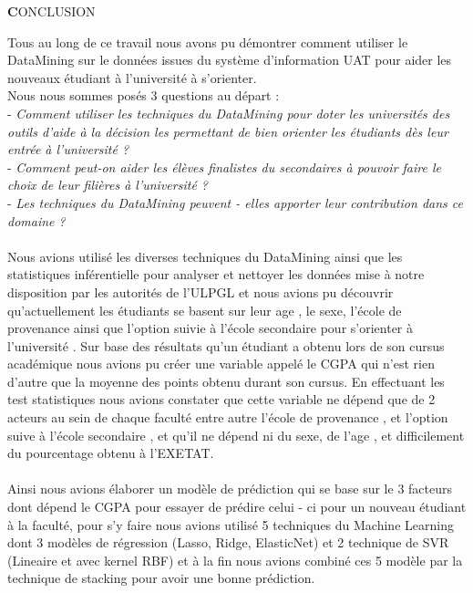 \begin{center}
	 {\LARGE  \textbf CONCLUSION}	
	\end{center}
Tous au long de ce travail nous avons pu démontrer comment utiliser le DataMining sur le données issues du système d'information \ac{UAT} pour aider les nouveaux étudiant à l'université à s'orienter.\\
Nous nous sommes posés 3 questions au départ : \\
- \emph{Comment utiliser les techniques  du DataMining pour doter les universités des outils d'aide à la décision les permettant de bien orienter les étudiants dès leur entrée à l'université ?  }\\
- \emph{Comment peut-on aider les élèves finalistes du secondaires  à pouvoir faire le choix de leur filières à l'université ? }\\
- \emph{Les techniques du DataMining peuvent - elles apporter leur contribution dans ce domaine ? }
\paragraph{}
Nous avions utilisé les diverses techniques du DataMining ainsi que les statistiques inférentielle pour analyser  et nettoyer les données mise à notre disposition par les autorités de l'\ac{ULPGL} et nous avions pu découvrir qu'actuellement les étudiants se basent sur leur age , le sexe, l'école de provenance ainsi que l'option suivie à l'école secondaire pour s'orienter à l'université .
Sur base des résultats qu'un étudiant a obtenu lors de son cursus académique nous avions pu créer une variable appelé le \ac{CGPA}  qui  n'est rien d'autre que la moyenne des points obtenu durant son cursus. 
En effectuant les test statistiques nous avions constater que cette variable ne dépend  que de 2 acteurs au sein de chaque faculté entre autre l'école de provenance , et l'option suive à l'école secondaire , et qu'il ne dépend ni du sexe, de l'age , et difficilement du pourcentage obtenu à l'\ac{EXETAT}.
\paragraph{}
Ainsi nous avions élaborer un modèle de prédiction   qui se base sur le 3 facteurs dont dépend le CGPA pour essayer de prédire celui - ci pour un nouveau étudiant à la faculté, pour s'y faire nous avions utilisé 5 techniques du Machine Learning dont 3 modèles de régression (Lasso, Ridge, ElasticNet) et 2 technique de \ac{SVR} (Lineaire et avec kernel RBF)  et à la fin nous avions combiné ces 5 modèle par la technique de stacking pour avoir une bonne prédiction.

